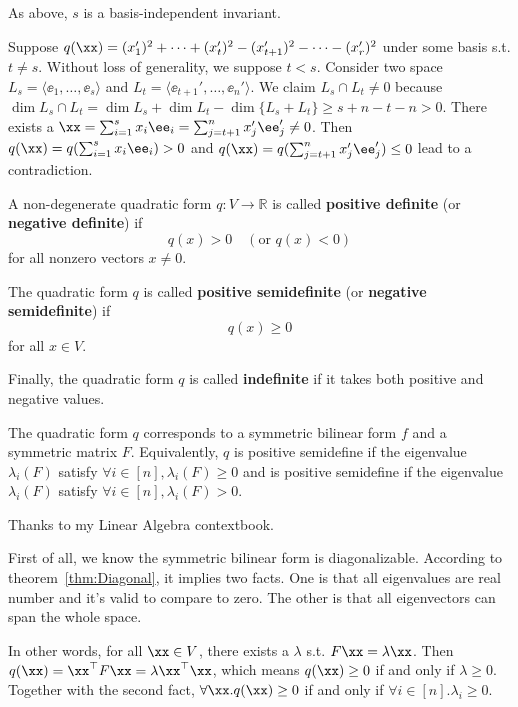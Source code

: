 \documentclass[12pt]{article}
\begin{document}
\begin{Theorem}
  As above, $s$ is a basis-independent
  invariant.
\end{Theorem}

\begin{Proof}
  Suppose $q(\xx) = (x_1')^2 + \dots + (x_t')^2
  - (x_{t+1}')^2 - \dots - (x_r')^2$ under some
  basis s.t. $t \neq s$. Without loss of
  generality, we suppose $t < s$. Consider two
  space $L_s = \langle \ee_1, \dots, \ee_s
  \rangle$ and $L_t = \langle \ee_{t+1}',
  \dots, \ee_{n}' \rangle$. We claim $L_s \cap
  L_t \neq 0$ because $\dim{L_s \cap L_t} =
  \dim{L_s} + \dim{L_t} - \dim{\{ L_s + L_t \}}
  \geq s + n - t - n > 0$. There exists a
  $\xx = \sum_{i=1}^s x_i \ee_i =
  \sum_{j = t+1}^n x_j' \ee_j' \neq 0$.
  Then $q(\xx)= q(\sum_{i=1}^s x_i \ee_i) > 0$
  and $q(\xx) = q(\sum_{j = t+1}^n x_j' \ee_j')
  \leq 0$ lead to a contradiction.
\end{Proof}

\begin{Define}
  A non-degenerate quadratic form \( q: V \to \mathbb{R} \) is called \textbf{positive definite} (or \textbf{negative definite}) if
\[
q(x) > 0 \quad (\text{or } q(x) < 0)
\]
for all nonzero vectors \( x \ne 0 \).

The quadratic form \( q \) is called \textbf{positive semidefinite} (or \textbf{negative semidefinite}) if
\[
q(x) \ge 0
\]
for all \( x \in V \).

Finally, the quadratic form \( q \) is called \textbf{indefinite} if it takes both positive and negative values.
\end{Define}

\begin{Theorem}
  The quadratic form $q$ corresponds to a
  symmetric bilinear form $f$ and a symmetric
  matrix $F$. Equivalently, $q$ is positive
  semidefine if the eigenvalue
  $\lambda_i(F)$ satisfy $\forall i \in [n],
  \lambda_i(F) \geq 0$ and is positive
  semidefine if the eigenvalue $\lambda_i(F)$
  satisfy $\forall i \in [n], \lambda_i(F) >0$.
\end{Theorem}

Thanks to my Linear Algebra contextbook.
\begin{Proof}
  First of all, we know the symmetric bilinear
  form is diagonalizable. According to
  theorem~\ref{thm:Diagonal}, it implies two
  facts. One is that all eigenvalues are real
  number and it's valid to compare to zero.
  The other is that all eigenvectors can span
  the whole space.

  In other words, for all $\xx \in V$, there
  exists a $\lambda$ s.t. $F\xx = \lambda\xx$.
  Then $q(\xx) = \xx^\top F \xx =
  \lambda \xx^\top \xx$, which means $q(\xx)
  \geq 0$ if and only if $\lambda \geq 0$.
  Together with the second fact, $\forall \xx.
  q(\xx) \geq 0$ if and only if $\forall i \in
  [n]. \lambda_i \geq 0$.
\end{Proof}
\end{document}
